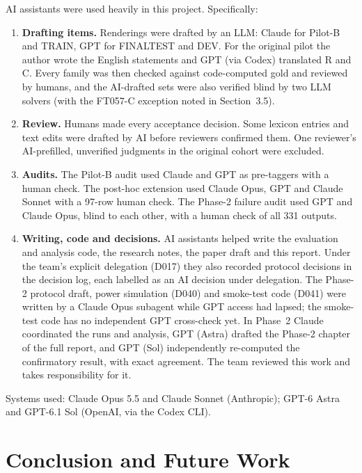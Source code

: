 \documentclass[12pt,a4paper,oneside]{report}
\renewcommand{\_}{\oldunderscore\allowbreak}
\begin{document}
AI assistants were used heavily in this project. Specifically:
\begin{enumerate}
\item \textbf{Drafting items.} Renderings were drafted by an LLM: Claude for Pilot-B and TRAIN, GPT for FINAL\_TEST and DEV. For the original pilot the author wrote the English statements and GPT (via Codex) translated R and C. Every family was then checked against code-computed gold and reviewed by humans, and the AI-drafted sets were also verified blind by two LLM solvers (with the FT057-C exception noted in Section~3.5).
\item \textbf{Review.} Humans made every acceptance decision. Some lexicon entries and text edits were drafted by AI before reviewers confirmed them. One reviewer's AI-prefilled, unverified judgments in the original cohort were excluded.
\item \textbf{Audits.} The Pilot-B audit used Claude and GPT as pre-taggers with a human check. The post-hoc extension used Claude Opus, GPT and Claude Sonnet with a 97-row human check. The Phase-2 failure audit used GPT and Claude Opus, blind to each other, with a human check of all 331 outputs.
\item \textbf{Writing, code and decisions.} AI assistants helped write the evaluation and analysis code, the research notes, the paper draft and this report. Under the team's explicit delegation (D017) they also recorded protocol decisions in the decision log, each labelled as an AI decision under delegation. The Phase-2 protocol draft, power simulation (D040) and smoke-test code (D041) were written by a Claude Opus subagent while GPT access had lapsed; the smoke-test code has no independent GPT cross-check yet. In Phase~2 Claude coordinated the runs and analysis, GPT (Astra) drafted the Phase-2 chapter of the full report, and GPT (Sol) independently re-computed the confirmatory result, with exact agreement. The team reviewed this work and takes responsibility for it.
\end{enumerate}
Systems used: Claude Opus 5.5 and Claude Sonnet (Anthropic); GPT-6 Astra and GPT-6.1 Sol (OpenAI, via the Codex CLI).

\chapter{Conclusion and Future Work}
\label{ch:conclusion}
\end{document}
